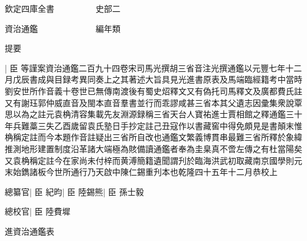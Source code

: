 欽定四庫全書　　　　　史部二

資治通鑑　　　　　　　編年類

提要

|{
	臣}
等謹案資治通鑑二百九十四卷宋司馬光撰胡三省音注光撰通鑑以元豐七年十二月戊辰書成與目録考異同奏上之其著述大旨具見光進書原表及馬端臨經籍考中當時劉安世所作音義十卷世已無傳南渡後有蜀史炤釋文又有偽托司馬釋文及廣都費氏註又有謝珏郭仲威直音及閩本直音羣書並行而乖謬咸甚三省本其父遺志因彚集衆說覃思以為之註元袁桷清容集載先友淵源録稱三省天台人寶祐進士賈相館之釋通鑑三十年兵難藁三失乙酉歲留袁氏塾日手抄定註己丑寇作以書藏窖中得免頗見是書顛末惟桷稱定註而今本題作音註疑出三省所自改也通鑑文繁義博貫串最難三省所釋於象緯推測地形建置制度沿革諸大端極為賅備讀通鑑者奉為圭臬真不啻左傳之有杜當陽矣又袁桷稱定註今在家尚未付梓而黄溥簡籍遺聞謂刋於臨海洪武初取藏南京國學則元末始鐫諸板今世所通行乃天啟中陳仁錫重刋本也乾隆四十五年十二月恭校上

總纂官|{
	臣}
紀昀|{
	臣}
陸錫熊|{
	臣}
孫士毅

總校官|{
	臣}
陸費墀

進資治通鑑表

